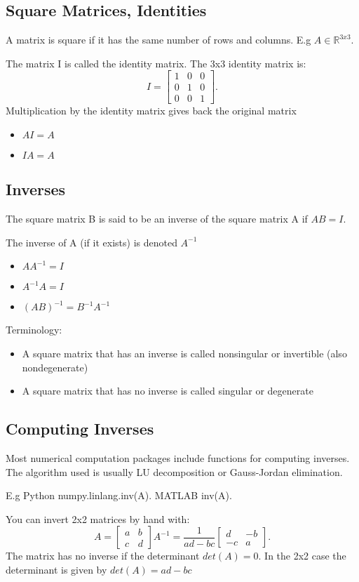 \documentclass[a4paper]{article}
\newcommand{\R}{\mathbb{R}}
\newcommand{\0}{\mathbb{\emptyset}}
\begin{document}
	\subsection{Square Matrices, Identities}
	A matrix is square if it has the same number of rows and columns. E.g $A
	\in \R^{3x3}$. \par
	The matrix I is called the identity matrix. The 3x3 identity matrix is:
	\[
		I = \begin{bmatrix} 1 & 0 & 0 \\
		0 & 1 & 0 \\
	        0 & 0 & 1 \end{bmatrix} 
	.\] 
	Multiplication by the identity matrix gives back the original matrix
	\begin{itemize}
		\item $AI=A$ 
		\item $IA = A$
	\end{itemize}
	\subsection{Inverses}
	The square matrix B is said to be an inverse of the square matrix A if
	$AB = I$. \par
	The inverse of A (if it exists) is denoted $A^{-1}$ 
	\begin{itemize}
		\item $AA^{-1}=I$ 
		\item $A^{-1}A=I$ 
		\item $(AB)^{-1}=B^{-1}A^{-1}$
	\end{itemize}
	Terminology:
	\begin{itemize}
		\item A square matrix that has an inverse is called nonsingular
			or invertible (also nondegenerate)
		\item A square matrix that has no inverse is called singular or
			degenerate
	\end{itemize}
	\subsection{Computing Inverses}
	Most numerical computation packages include functions for computing
	inverses. The algorithm used is usually LU decomposition or Gauss-Jordan
	elimination. \par
	E.g Python numpy.linlang.inv(A). MATLAB inv(A). \par
	You can invert 2x2 matrices by hand with:
	\[
		A= \begin{bmatrix} a & b \\ c & d \end{bmatrix} 
		A^{-1}=\frac{1}{ad-bc}\begin{bmatrix} d & -b \\ -c & a \end{bmatrix} 
	.\] 
	The matrix has no inverse if the determinant $det(A)=0$. In the 2x2 case
	the determinant is given by  $det(A)=ad-bc$ 
\end{document}
